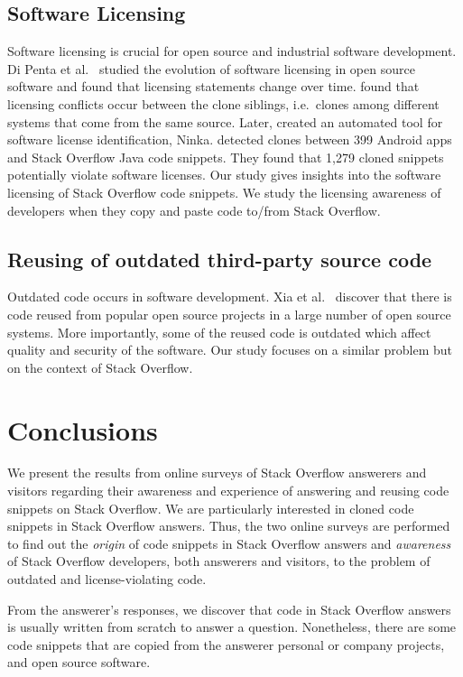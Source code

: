 \documentclass{svjour3}                     %
\begin{document}
\subsection{Software Licensing} Software licensing is crucial for open source
and industrial software development. Di Penta et al.~\cite{DiPenta2010} studied
the evolution of software licensing in open source software and found that
licensing statements change over time. \cite{German2009} found that licensing
conflicts occur between the clone siblings, i.e.~clones among different systems
that come from the same source. Later, \cite{German2010} created an automated
tool for software license identification, Ninka. \cite{An2017} detected clones
between 399 Android apps and Stack Overflow Java code snippets. They found  that
1,279 cloned snippets potentially violate software licenses. Our study gives
insights into the software licensing of Stack Overflow code snippets. We study
the licensing awareness of developers when they copy and paste code to/from
Stack Overflow.

\subsection{Reusing of outdated third-party source code} Outdated code occurs in
software development. Xia et al.~\cite{Xia2014} discover that there is code
reused from popular open source projects in a large number of open source
systems. More importantly, some of the reused code is outdated which affect
quality and security of the software. Our study focuses on a similar problem but
on the context of Stack Overflow.

\section{Conclusions}

We present the results from online surveys of Stack Overflow answerers and
visitors regarding their awareness and experience of answering and reusing code
snippets on Stack Overflow. We are particularly interested in cloned code
snippets in Stack Overflow answers. Thus, the two online surveys are performed to
find out the \textit{origin} of code snippets in Stack Overflow answers and
\textit{awareness} of Stack Overflow developers, both answerers and visitors,
to the problem of outdated and license-violating code.

From the answerer's responses, we discover that code in Stack Overflow answers
is usually written from scratch to answer a question. Nonetheless, there are
some code snippets that are copied from the answerer personal or company
projects, and open source software.
\end{document}
